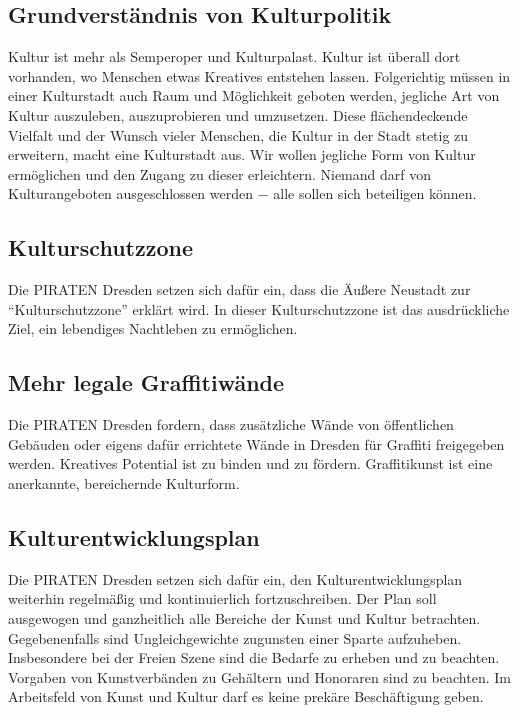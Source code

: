 \documentclass[a4paper, 11pt]{article}
\begin{document}
\subsection{Grundverständnis von Kulturpolitik}
Kultur ist mehr als Semperoper und Kulturpalast. Kultur ist überall dort vorhanden, wo Menschen etwas Kreatives entstehen lassen. Folgerichtig müssen in einer Kulturstadt auch Raum und Möglichkeit geboten werden, jegliche Art von Kultur auszuleben, auszuprobieren und umzusetzen. Diese flächendeckende Vielfalt und der Wunsch vieler Menschen, die Kultur in der Stadt stetig zu erweitern, macht eine Kulturstadt aus. Wir wollen jegliche Form von Kultur ermöglichen und den Zugang zu dieser erleichtern. Niemand darf von Kulturangeboten ausgeschlossen werden $-$ alle sollen sich beteiligen können.



\subsection{Kulturschutzzone}
Die PIRATEN Dresden setzen sich dafür ein, dass die Äußere Neustadt zur ``Kulturschutzzone'' erklärt wird. In dieser Kulturschutzzone ist das ausdrückliche Ziel, ein lebendiges Nachtleben zu ermöglichen.


\subsection{Mehr legale Graffitiwände}
Die PIRATEN Dresden fordern, dass zusätzliche Wände von öffentlichen Gebäuden oder eigens dafür errichtete Wände in Dresden für Graffiti freigegeben werden. Kreatives Potential ist zu binden und zu fördern. Graffitikunst ist eine anerkannte, bereichernde Kulturform.


\subsection{Kulturentwicklungsplan}
Die PIRATEN Dresden setzen sich dafür ein, den Kulturentwicklungsplan weiterhin regelmäßig und kontinuierlich fortzuschreiben. Der Plan soll ausgewogen und ganzheitlich alle Bereiche der Kunst und Kultur betrachten. Gegebenenfalls sind Ungleichgewichte zugunsten einer Sparte aufzuheben. Insbesondere bei der Freien Szene sind die Bedarfe zu erheben und zu beachten. Vorgaben von Kunstverbänden zu Gehältern und Honoraren sind zu beachten. Im Arbeitsfeld von Kunst und Kultur darf es keine prekäre Beschäftigung geben.
\end{document}
